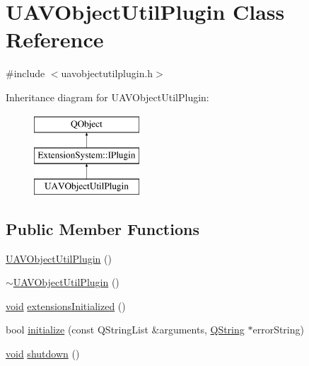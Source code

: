 \hypertarget{class_u_a_v_object_util_plugin}{\section{U\-A\-V\-Object\-Util\-Plugin Class Reference}
\label{class_u_a_v_object_util_plugin}
}


{\ttfamily \#include $<$uavobjectutilplugin.\-h$>$}

Inheritance diagram for U\-A\-V\-Object\-Util\-Plugin\-:\begin{figure}[H]
\begin{center}
\leavevmode
\includegraphics[height=3.000000cm]{class_u_a_v_object_util_plugin}
\end{center}
\end{figure}
\subsection*{Public Member Functions}
\begin{DoxyCompactItemize}
\item 
\hyperlink{group___u_a_v_object_util_plugin_ga3b705535aeae994a52c3d401767492c8}{U\-A\-V\-Object\-Util\-Plugin} ()
\item 
\hyperlink{group___u_a_v_object_util_plugin_ga1818db06a0b7162d9b933a9418dee8d6}{$\sim$\-U\-A\-V\-Object\-Util\-Plugin} ()
\item 
\hyperlink{group___u_a_v_objects_plugin_ga444cf2ff3f0ecbe028adce838d373f5c}{void} \hyperlink{group___u_a_v_object_util_plugin_ga644ec0f06cf775004f4f5cd28a60080a}{extensions\-Initialized} ()
\item 
bool \hyperlink{group___u_a_v_object_util_plugin_ga21707781be0dfd017ec41e59ef8bf7af}{initialize} (const Q\-String\-List \&arguments, \hyperlink{group___u_a_v_objects_plugin_gab9d252f49c333c94a72f97ce3105a32d}{Q\-String} $\ast$error\-String)
\item 
\hyperlink{group___u_a_v_objects_plugin_ga444cf2ff3f0ecbe028adce838d373f5c}{void} \hyperlink{group___u_a_v_object_util_plugin_ga14d874a44f94ae805fa0d683410ccfcb}{shutdown} ()
\end{DoxyCompactItemize}


